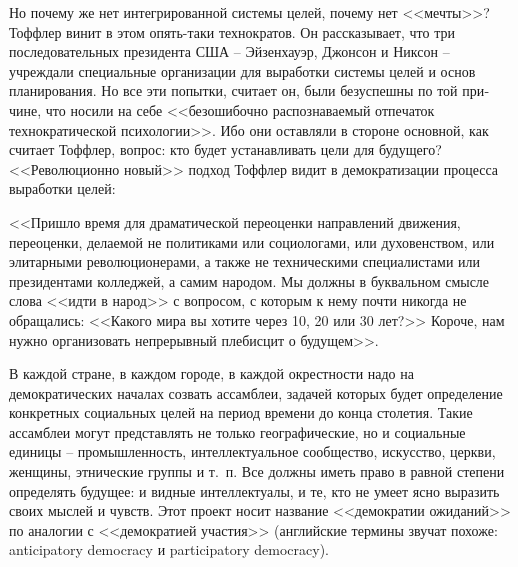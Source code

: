 \documentclass{book}
\begin{document}
Но почему же нет интегрированной системы целей, почему нет <<мечты>>? Тоффлер винит в этом опять-таки технократов. Он рассказывает, что три последовательных президента США -- Эйзенхауэр, Джонсон и Никсон -- учреждали специальные орга­низации для выработки системы целей и основ планирования. Но все эти попытки, считает он, были безуспешны по той при­чине, что носили на себе <<безошибочно распознаваемый отпе­чаток технократической психологии>>.%
Ибо они оставляли в стороне основной, как считает Тоффлер, вопрос: кто будет устанавливать цели для будущего? <<Революционно новый>> под­ход Тоффлер видит в демократизации процесса выработки це­лей:

<<Пришло время для драматической переоценки направлений движения, переоценки, делаемой не политиками или социоло­гами, или духовенством, или элитарными революционерами, а также не техническими специалистами или президентами кол­леджей, а самим народом. Мы должны в буквальном смысле слова <<идти в народ>> с вопросом, с которым к нему почти ни­когда не обращались: <<Какого мира вы хотите через 10, 20 или 30 лет?>> Короче, нам нужно организовать непрерывный плебис­цит о будущем>>.%

В каждой стране, в каждом городе, в каждой окрестности надо на демократических началах созвать ассамблеи, задачей которых будет определение конкретных социальных целей на период времени до конца столетия. Такие ассамблеи могут представлять не только географические, но и социальные единицы -- промышленность, интеллектуальное сообщество, искусство, церкви, женщины, этнические группы и т.~п. Все должны иметь право в равной степени определять будущее: и видные интеллектуалы, и те, кто не умеет ясно выразить своих мыслей и чувств. Этот проект носит название <<демократии ожиданий>> по аналогии с <<демократией участия>> (английские термины звучат похоже: anticipatory democracy и participatory democracy).
\end{document}

